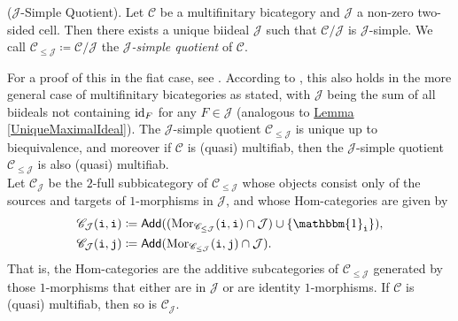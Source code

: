 \noindent\begin{theoremdefinition}\textup{($\mathcal{J}$-Simple Quotient).} Let $\mathscr{C}$ be a multifinitary bicategory and $\mathcal{J}$ a non-zero two-sided cell. Then there exists a unique biideal $\mathscr{J}$ such that $\mathscr{C}/\mathscr{J}$ is $\mathcal{J}$-simple.  We call $\mathscr{C}_{\leq\mathcal{J}} \coloneqq \mathscr{C}/\mathscr{J}$ the {\em $\mathcal{J}$-simple quotient} of $\mathscr{C}$.\\
\end{theoremdefinition}

\noindent For a proof of this in the fiat case, see \cite[Theorem 15]{MM14}.  According to \cite{MMMTZ21}, this also holds in the more general case of multifinitary bicategories as stated, with $\mathscr{J}$ being the sum of all biideals not containing $\textup{id}_F$ for any $F \in \mathcal{J}$ (analogous to \hyperref[UniqueMaximalIdeal]{Lemma \ref*{UniqueMaximalIdeal}}). The $\mathcal{J}$-simple quotient $\mathscr{C}_{\leq\mathcal{J}}$ is unique up to biequivalence, and moreover if $\mathscr{C}$ is (quasi) multifiab, then the $\mathcal{J}$-simple quotient $\mathscr{C}_{\leq\mathcal{J}}$ is also (quasi) multifiab.\\

\noindent Let $\mathscr{C}_\mathcal{J}$ be the $2$-full subbicategory of $\mathscr{C}_{\leq\mathcal{J}}$ whose objects consist only of the sources and targets of $1$-morphisms in $\mathcal{J}$, and whose Hom-categories are given by
\begin{align*}
\begin{split}
\mathscr{C}_\mathcal{J}(\textobj{i}, \textobj{i}) &\coloneqq \textsf{Add}((\morset_{\mathscr{C}_{\leq\mathcal{J}}}(\textobj{i}, \textobj{i}) \cap \mathcal{J}) \cup \{\mathbbm{1}_\textobj{i}\}),\\
\mathscr{C}_\mathcal{J}(\textobj{i}, \textobj{j}) &\coloneqq \textsf{Add}(\morset_{\mathscr{C}_{\leq\mathcal{J}}}(\textobj{i}, \textobj{j}) \cap \mathcal{J}).
\end{split}
\end{align*}
\noindent That is, the Hom-categories are the additive subcategories of $\mathscr{C}_{\leq\mathcal{J}}$ generated by those $1$-morphisms that either are in $\mathcal{J}$ or are identity $1$-morphisms. If $\mathscr{C}$ is (quasi) multifiab, then so is $\mathscr{C}_\mathcal{J}$.\newpage

